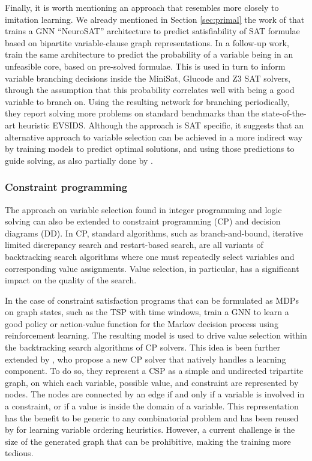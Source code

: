 \documentclass[twoside,11pt]{article}
\begin{document}
Finally, it is worth mentioning an approach that resembles more closely to imitation learning. We already mentioned in Section \ref{sec:primal} the work of \citet{Sel+2019} that trains a GNN ``NeuroSAT'' architecture to predict satisfiability of SAT formulae based on bipartite variable-clause graph representations. In a follow-up work, \citet{Sel+2019a} train the same architecture to predict the probability of a variable being in an unfeasible core, based on pre-solved formulae. This is used in turn to inform variable branching decisions inside the MiniSat, Glucode and Z3 SAT solvers, through the assumption that this probability correlates well with being a good variable to branch on. Using the resulting network for branching periodically, they report solving more problems on standard benchmarks than the state-of-the-art heuristic EVSIDS. Although the approach is SAT specific, it suggests that an alternative approach to variable selection can be achieved in a more indirect way by training models to predict optimal solutions, and using those predictions to guide solving, as also partially done by \cite{khalil2022mip}.

\subsubsection{Constraint programming}

The approach on variable selection found in integer programming and logic solving can also be extended to constraint programming (CP) and decision diagrams (DD). In CP, standard algorithms, such as branch-and-bound, iterative limited discrepancy search and restart-based search, are all variants of backtracking search algorithms where one must repeatedly select variables and corresponding value assignments. Value selection, in particular, has a significant impact on the quality of the search.

 In the case of constraint satisfaction programs that can be formulated as MDPs on graph states, such as the TSP with time windows, \citet{cappart2020combining} train a GNN to learn a good policy or action-value function for the Markov decision process using reinforcement learning. The resulting model is used to drive value selection within the backtracking search algorithms of CP solvers. 
 This idea is been further extended by \citet{chalumeau2021seapearl}, who propose a new CP solver that natively handles a learning component.
 To do so, they represent a CSP as a simple and undirected tripartite graph, on which each variable, possible value, and constraint are represented by nodes. The nodes are connected by an edge if and only if a variable is involved in a constraint, or if a value is inside the 
 domain of a variable. This representation has the benefit to be generic to any combinatorial problem and has
 been reused by \citet{song2022learning} for learning variable ordering heuristics.
 However, a current challenge is the size of the generated graph that can be prohibitive, making the training more tedious.
 
\end{document}
